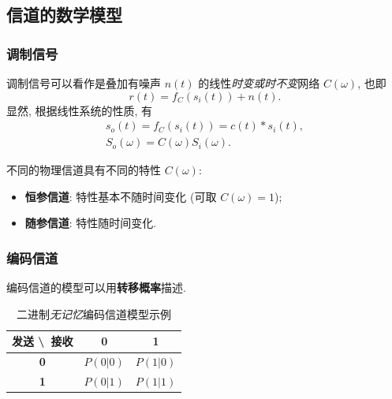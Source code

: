 \subsection{信道的数学模型}
\subsubsection{调制信号}
调制信号可以看作是叠加有噪声 $n(t)$ 的线性\textit{时变或时不变}网络 $C(\omega)$, 也即
\begin{equation}
    r(t)=f_C(s_i(t))+n(t).
\end{equation}
显然, 根据线性系统的性质, 有
\begin{gather}
    s_o(t)=f_C(s_i(t))=c(t)*s_i(t), \\
    S_o(\omega)=C(\omega)S_i(\omega).
\end{gather}

不同的物理信道具有不同的特性 $C(\omega)$:
\begin{itemize}
    \item \textbf{恒参信道}: 特性基本不随时间变化 (可取 $C(\omega)=1$);
    \item \textbf{随参信道}: 特性随时间变化.
\end{itemize}

\subsubsection{编码信道}
编码信道的模型可以用\textbf{转移概率}描述.
\begin{table}[H]
    \caption{二进制\textit{无记忆}编码信道模型示例}
    \centering
    \begin{tabular}{|c|c|c|} \hline
        \bfseries 发送 \textbackslash\ 接收 & \bfseries 0 & \bfseries 1 \\\hline
        \bfseries 0                     & $P(0|0)$    & $P(1|0)$    \\\hline
        \bfseries 1                     & $P(0|1)$    & $P(1|1)$    \\\hline
    \end{tabular}
\end{table}
